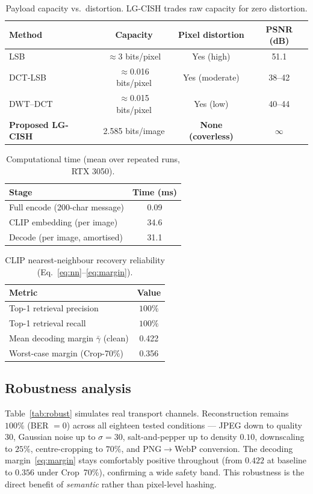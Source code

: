 \documentclass[10pt]{article}
\begin{document}
\begin{table}[t]
\centering
\caption{Payload capacity vs.\ distortion. LG-CISH trades raw capacity for zero distortion.}\label{tab:capacity}
\begin{tabular}{@{}lccc@{}}
\toprule
Method & Capacity & Pixel distortion & PSNR (dB) \\
\midrule
LSB~\cite{chan2004}        & $\approx$3 bits/pixel   & Yes (high)     & 51.1 \\
DCT-LSB~\cite{westfeld2001f5} & $\approx$0.016 bits/pixel & Yes (moderate) & 38--42 \\
DWT--DCT~\cite{westfeld2001f5} & $\approx$0.015 bits/pixel & Yes (low)      & 40--44 \\
\textbf{Proposed LG-CISH}  & 2.585 bits/image        & \textbf{None (coverless)} & $\infty$ \\
\bottomrule
\end{tabular}
\end{table}

\begin{table}[t]
\centering
\caption{Computational time (mean over repeated runs, RTX 3050).}\label{tab:timing}
\begin{tabular}{@{}lc@{}}
\toprule
Stage & Time (ms) \\
\midrule
Full encode (200-char message) & 0.09 \\
CLIP embedding (per image)     & 34.6 \\
Decode (per image, amortised)  & 31.1 \\
\bottomrule
\end{tabular}
\end{table}

\begin{table}[t]
\centering
\caption{CLIP nearest-neighbour recovery reliability (Eq.~\eqref{eq:nn}--\eqref{eq:margin}).}\label{tab:retrieval}
\begin{tabular}{@{}lc@{}}
\toprule
Metric & Value \\
\midrule
Top-1 retrieval precision & $100\%$ \\
Top-1 retrieval recall    & $100\%$ \\
Mean decoding margin $\bar\gamma$ (clean) & 0.422 \\
Worst-case margin (Crop-70\%) & 0.356 \\
\bottomrule
\end{tabular}
\end{table}

\subsection{Robustness analysis}
Table~\ref{tab:robust} simulates real transport channels. Reconstruction remains
$100\%$ (BER $=0$) across all eighteen tested conditions --- JPEG down to quality
30, Gaussian noise up to $\sigma{=}30$, salt-and-pepper up to density $0.10$,
downscaling to $25\%$, centre-cropping to $70\%$, and PNG$\to$WebP conversion.
The decoding margin~\eqref{eq:margin} stays comfortably positive throughout
(from $0.422$ at baseline to $0.356$ under Crop~70\%), confirming a wide safety
band. This robustness is the direct benefit of \emph{semantic} rather than
pixel-level hashing.
\end{document}
